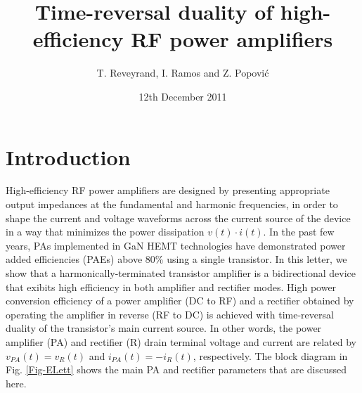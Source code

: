 \documentclass[twocolumn]{el-author}
\date{12th December 2011}
\begin{document}
\title{{Time-reversal duality of high-efficiency RF power amplifiers}}

\author{T. Reveyrand, I. Ramos and Z. Popovi\'c}





\maketitle



\section{Introduction}

High-efficiency RF power amplifiers are designed by presenting appropriate output impedances at the fundamental and harmonic frequencies, in order to shape the current and voltage waveforms across the current source of the device in a way that minimizes the power dissipation $v(t) \cdot i(t)$. In the past few years, PAs implemented in GaN HEMT technologies have demonstrated power added efficiencies (PAEs) above 80\% using a single transistor. In this letter, we show that a harmonically-terminated transistor amplifier is a bidirectional device that exibits high efficiency in both amplifier and rectifier modes. High power conversion efficiency of a power amplifier (DC to RF) and a rectifier obtained by operating the amplifier in reverse (RF to DC) is achieved with time-reversal duality \cite{1} of the transistor's main current source. In other words, the power amplifier (PA) and rectifier (R) drain terminal voltage and current are related by $v_{PA}(t)=v_R(t)$ and $i_{PA}(t)=-i_R(t)$, respectively. The block diagram in Fig. \ref{Fig-ELett} shows the main PA and rectifier parameters that are discussed here. 
\end{document}
